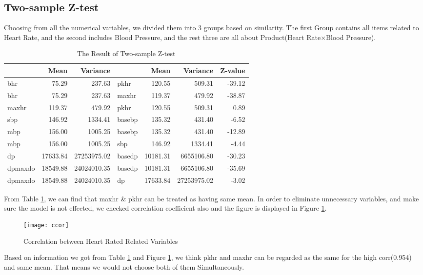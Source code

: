 \documentclass[a4paper,12pt]{article}
\begin{document}
  \subsection{Two-sample Z-test}
  Choosing from all the numerical variables, we divided them into 3 groups based on similarity. The first Group contains all items related to Heart Rate, and the second includes Blood Pressure, and the rest three are all about Product(Heart Rate$\times$Blood Pressure).
    \begin{table}[htbp]
      \centering
      \caption{The Result of Two-sample Z-test}
        \begin{tabular}{lrrlrrr}
        \toprule[1.5pt]
              & Mean  & Variance &       & Mean  & Variance & Z-value \\
        \midrule
        bhr   & 75.29 & 237.63 &  pkhr & 120.55 & 509.31 & -39.12 \\
        bhr   & 75.29 & 237.63 &  maxhr & 119.37 & 479.92 & -38.87 \\
        maxhr & 119.37 & 479.92 &  pkhr & 120.55 & 509.31 & 0.89 \\
        \midrule
        sbp   & 146.92 & 1334.41 &  basebp & 135.32 & 431.40 & -6.52 \\
        mbp   & 156.00 & 1005.25 &  basebp & 135.32 & 431.40 & -12.89 \\
        mbp   & 156.00 & 1005.25 &  sbp  & 146.92 & 1334.41 & -4.44 \\
        \midrule
        dp    & 17633.84 & 27253975.02 &  basedp & 10181.31 & 6655106.80 & -30.23 \\
        dpmaxdo & 18549.88 & 24024010.35 &  basedp & 10181.31 & 6655106.80 & -35.69 \\
        dpmaxdo & 18549.88 & 24024010.35 &  dp   & 17633.84 & 27253975.02 & -3.02 \\
        \bottomrule[1.5pt]
        \end{tabular}%
      \label{ZT}%
    \end{table}%
    From Table \ref{ZT}, we can find that maxhr \& pkhr can be treated as having same mean. In order to eliminate unnecessary variables, and make sure the model is not effected, we checked correlation coefficient also and the figure is displayed in Figure \ref{corr}.
      \begin{figure}[htbp]
        \centering
        \texttt{[image: ccor]}
        \caption{Correlation between Heart Rated Related Variables}
        \label{corr}
      \end{figure}
    Based on information we got from Table \ref{ZT} and Figure \ref{corr}, we think pkhr and maxhr can be regarded as the same for the high corr(0.954) and same mean. That means we would not choose both of them Simultaneously.
\end{document}

